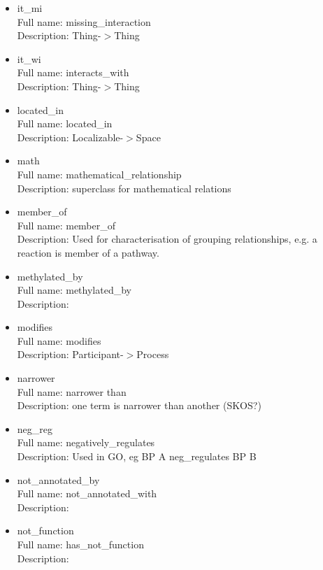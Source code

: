 \begin{itemize}
\item{it\_mi}\\ Full name: missing\_interaction\\ Description: Thing-$>$Thing 

\item{it\_wi}\\ Full name: interacts\_with\\ Description: Thing-$>$Thing 

\item{located\_in}\\ Full name: located\_in\\ Description: Localizable-$>$Space 

\item{math}\\ Full name: mathematical\_relationship\\ Description: superclass for mathematical relations 

\item{member\_of}\\ Full name: member\_of\\ Description: Used for characterisation of grouping relationships, e.g. a reaction is member of a pathway. 

\item{methylated\_by}\\ Full name: methylated\_by\\ Description: 

\item{modifies}\\ Full name: modifies\\ Description: Participant-$>$Process 

\item{narrower}\\ Full name: narrower than\\ Description: one term is narrower than another (SKOS?) 

\item{neg\_reg}\\ Full name: negatively\_regulates\\ Description: Used in GO, eg BP A neg\_regulates BP B 

\item{not\_annotated\_by}\\ Full name: not\_annotated\_with\\ Description: 

\item{not\_function}\\ Full name: has\_not\_function\\ Description: 


\end{itemize}

